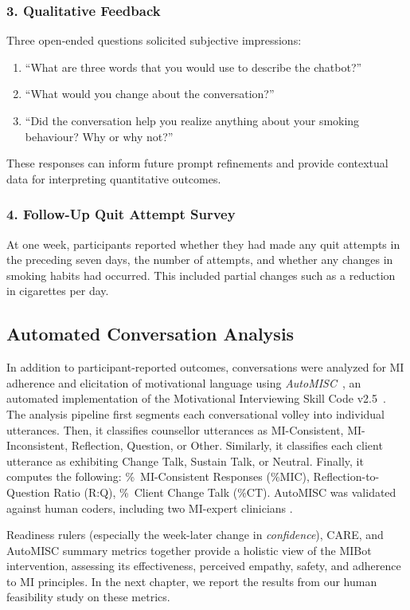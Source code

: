 \subsubsection{3. Qualitative Feedback}
Three open-ended questions solicited subjective impressions:
\begin{enumerate}
    \item ``What are three words that you would use to describe the chatbot?''
    \item ``What would you change about the conversation?''
    \item ``Did the conversation help you realize anything about your smoking behaviour? Why or why not?''
\end{enumerate}
These responses can inform future prompt refinements and provide contextual data for interpreting quantitative outcomes.

\subsubsection{4. Follow-Up Quit Attempt Survey}
At one week, participants reported whether they had made any quit attempts in the preceding seven days, the number of attempts, and whether any changes in smoking habits had occurred. This included partial changes such as a reduction in cigarettes per day.

\subsection{Automated Conversation Analysis}
\label{subsec:automisc}
In addition to participant-reported outcomes, conversations were analyzed for MI adherence and elicitation of motivational language using \textit{AutoMISC}~\cite{mahmood2025fully}, an automated implementation of the Motivational Interviewing Skill Code v2.5~\citep{Houck2010}. The analysis pipeline first segments each conversational volley into individual utterances. Then, it classifies counsellor utterances as MI-Consistent, MI-Inconsistent, Reflection, Question, or Other. Similarly, it classifies each client utterance as exhibiting Change Talk, Sustain Talk, or Neutral. Finally, it computes the following: \%~MI-Consistent Responses (\%MIC), Reflection-to-Question Ratio (R:Q), \%~Client Change Talk (\%CT). AutoMISC was validated against human coders, including two MI-expert clinicians \cite{mahmood-etal-2025-fully}.


Readiness rulers (especially the week-later change in \emph{confidence}), CARE, and AutoMISC summary metrics together provide a holistic view of the MIBot intervention, assessing its effectiveness, perceived empathy, safety, and adherence to MI principles. In the next chapter, we report the results from our human feasibility study on these metrics.